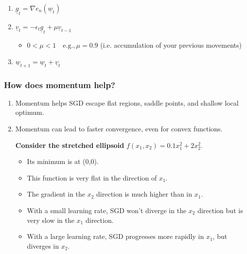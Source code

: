     \begin{definition}
        \begin{enumerate}
            \item $\underline{g}_t = \nabla e_n(\underline{w}_t)$
            \item $\underline{v}_t = -\epsilon_t \underline{g}_t + \mu \underline{v}_{t-1}$
            \begin{itemize}
                \item $0 < \mu < 1 \quad \text{e.g.,} \, \mu = 0.9$ (i.e. accumulation of your previous movements)
            \end{itemize}
            \item $\underline{w}_{t+1} = \underline{w}_t + \underline{v}_t$
        \end{enumerate}
    \end{definition}

    \subsubsection{How does momentum help?}
    \begin{intuition}
        \begin{enumerate}
            \item Momentum helps SGD escape flat regions, saddle points, and shallow local optimum. 
            \item Momentum can lead to faster convergence, even for convex functions.

            \textbf{Consider the stretched ellipsoid} \(f(x_1, x_2) = 0.1x_1^2 + 2x_2^2.\)
            
            \begin{itemize}
                \item Its minimum is at (0,0).
                \item This function is very flat in the direction of \(x_1\).
                \item The gradient in the \(x_2\) direction is much higher than in \(x_1\).
                \item With a small learning rate, SGD won’t diverge in the \(x_2\) direction but is very slow in the \(x_1\) direction.
                \item With a large learning rate, SGD progresses more rapidly in \(x_1\), but diverges in \(x_2\).
            \end{itemize}
        \end{enumerate}
    \end{intuition}


